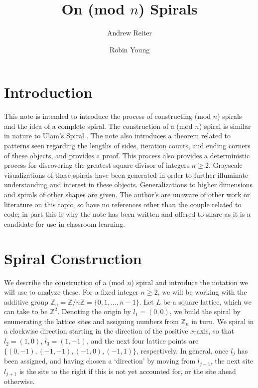 \documentclass[11pt,reqno]{amsart}
\title{On (mod $n$) Spirals}
\author{Andrew Reiter}
\author{Robin Young}
\theoremstyle{mydef}
\def\ZZ{\mathbb{Z}}
\begin{document}
\maketitle
\section{Introduction}

This note is intended to introduce the process of constructing (mod $n$) spirals and the idea of a complete spiral.  The construction of a (mod $n$) spiral is similar in nature to Ulam's Spiral \cite{Ulam}. The note also introduces a theorem related to patterns seen regarding the lengths of sides, iteration counts, and ending corners of these objects, and provides a proof. This process also provides a deterministic process for discovering the greatest square divisor of integers $n \ge 2$. Grayscale visualizations of these spirals have been generated in order to  further illuminate understanding and interest in these objects. Generalizations to higher dimensions and spirals of other shapes are given. The author's are unaware of other work or literature on this topic, so have no references other than the couple related to code; in part this is why the note has been written and offered to share as it is a candidate for use in classroom learning.



\section{Spiral Construction}

We describe the construction of a (mod $n$) spiral and introduce the
notation we will use to analyze these.  For a fixed integer $n \ge 2$,
we will be working with the additive group
$\ZZ_n=\mathbb{Z}/n\mathbb{Z} = \{ 0, 1, ..., n-1 \}$.  Let $L$
be a square lattice, which we can take to be $\ZZ^2$.  Denoting
the origin by $l_1 = (0,0)$, we build the spiral by enumerating the
lattice sites and assigning numbers from $\mathbb{Z}_n$ in turn.  We
spiral in a clockwise direction starting in the direction of the
positive $x$-axis, so that $l_2 = (1,0)$, $l_3 = (1,-1)$, and the next four
lattice points are $\{(0, -1),(-1, -1),(-1, 0),(-1, 1)\}$,
respectively.  In general, once $l_j$ has been assigned, and having
chosen a `direction' by moving from $l_{j-1}$, the next site $l_{j+1}$
is the site to the right if this is not yet accounted for, or the site
ahead otherwise.
\end{document}

